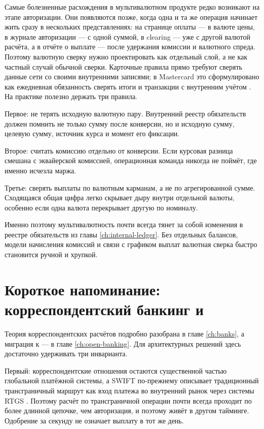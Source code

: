 Самые болезненные расхождения в мультивалютном продукте редко
возникают на этапе авторизации. Они появляются позже, когда
одна и та же операция начинает жить сразу в нескольких
представлениях: на странице оплаты --- в валюте цены, в журнале
авторизации --- с одной суммой, в clearing --- уже с другой
валютой расчёта, а в отчёте о выплате --- после удержания
комиссии и валютного спреда. Поэтому валютную сверку нужно
проектировать как отдельный слой,
а не как частный случай обычной сверки. Карточные правила
прямо требуют сверять данные сети со своими внутренними
записями; в Mastercard это сформулировано как ежедневная
обязанность сверять итоги и транзакции с внутренним учётом
\cite{mc-rules}. На практике полезно держать три правила.

Первое: не терять исходную валютную пару. Внутренний реестр
обязательств должен помнить не только сумму после конверсии,
но и исходную сумму, целевую сумму, источник курса
и момент его фиксации.

Второе: считать комиссию отдельно от конверсии. Если курсовая разница
смешана с эквайерской комиссией, операционная команда никогда
не поймёт, где именно исчезла маржа.

Третье: сверять выплаты по валютным карманам, а не по агрегированной
сумме. Сходящаяся общая цифра легко скрывает дыру внутри отдельной
валюты, особенно если одна валюта перекрывает другую по номиналу.

Именно поэтому мультивалютность почти всегда тянет за собой
изменения в реестре обязательств из главы \ref{ch:internal-ledger}.
Без отдельных балансов, модели начисления комиссий и связи
с графиком выплат валютная сверка быстро становится ручной
и хрупкой.

\section{Короткое напоминание: корреспондентский банкинг и }
\label{sec:mc-correspondent}

Теория корреспондентских расчётов подробно разобрана в главе
\ref{ch:banks}, а миграция к  --- в главе
\ref{ch:open-banking}. Для архитектурных решений здесь достаточно
удерживать три инварианта.

Первый: корреспондентские отношения остаются существенной
частью глобальной платёжной системы, а SWIFT по-прежнему
описывает традиционный трансграничный маршрут как вход
платежа во внутренний рынок через системы RTGS
\cite{fatf-correspondent-banking,swift-instant-interoperability}.
Поэтому расчёт по трансграничной операции почти всегда проходит
по более длинной цепочке, чем авторизация, и поэтому живёт
в другом тайминге. Одобрение за секунду не означает выплату
в тот же день.

